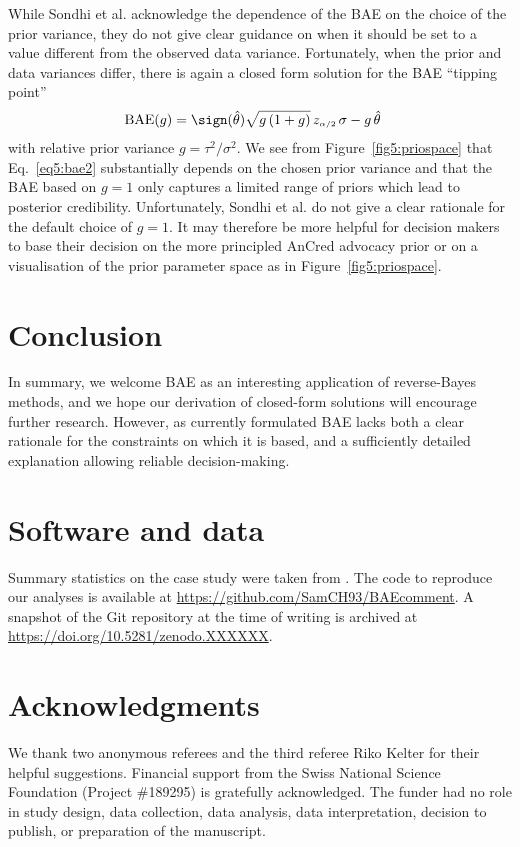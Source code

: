 While Sondhi et al. acknowledge the dependence of the BAE on the choice of the
prior variance, they do not give clear guidance on when it should be set to a
value different from the observed data variance. Fortunately, when the prior and
data variances differ, there is again a closed form solution for the BAE
``tipping point''
\begin{align}
  \text{BAE}(g)
  & =  \sign(\hat{\theta}) \sqrt{g \, (1 + g)} \, z_{\scriptscriptstyle \alpha/2} \, \sigma
    - g \, \hat{\theta}
    \label{eq5:bae2}
\end{align}
with relative prior variance $g = \tau^{2}/\sigma^{2}$. We see from
Figure~\ref{fig5:priospace} that Eq.~\eqref{eq5:bae2} substantially depends on the
chosen prior variance and that the BAE based on $g = 1$ only captures a limited
range of priors which lead to posterior credibility. Unfortunately, Sondhi et
al. do not give a clear rationale for the default choice of $g = 1$. It may
therefore be more helpful for decision makers to base their decision on the more
principled AnCred advocacy prior or on a visualisation of the prior parameter
space as in Figure~\ref{fig5:priospace}.

\section{Conclusion}
In summary, we welcome BAE as an interesting application of reverse-Bayes
methods, and we hope our derivation of closed-form solutions will encourage
further research. However, as currently formulated BAE lacks both a clear
rationale for the constraints on which it is based, and a sufficiently detailed
explanation allowing reliable decision-making.

\section*{Software and data}
Summary statistics on the case study were taken from \citet{Sondhi2021}. The
code to reproduce our analyses is available at
\url{https://github.com/SamCH93/BAEcomment}. A snapshot of the Git repository at
the time of writing is archived at \url{https://doi.org/10.5281/zenodo.XXXXXX}.

\section*{Acknowledgments}
We thank two anonymous referees and the third referee Riko Kelter for their
helpful suggestions. Financial support from the Swiss National Science
Foundation (Project \#189295) is gratefully acknowledged. The funder had no role
in study design, data collection, data analysis, data interpretation, decision
to publish, or preparation of the manuscript.



